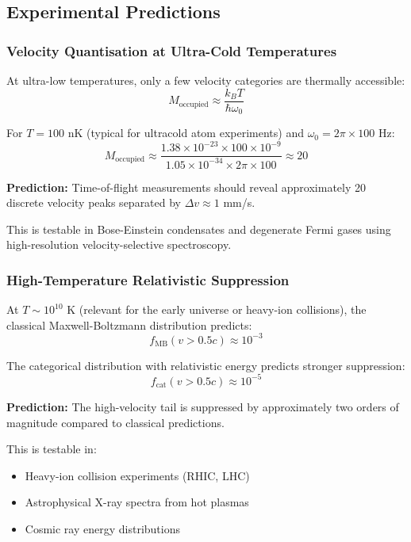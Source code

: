 \subsection{Experimental Predictions}

\subsubsection{Velocity Quantisation at Ultra-Cold Temperatures}

At ultra-low temperatures, only a few velocity categories are thermally accessible:
\begin{equation}
M_{\text{occupied}} \approx \frac{k_B T}{\hbar\omega_0}
\end{equation}

For $T = 100$ nK (typical for ultracold atom experiments) and $\omega_0 = 2\pi \times 100$ Hz:
\begin{equation}
M_{\text{occupied}} \approx \frac{1.38 \times 10^{-23} \times 100 \times 10^{-9}}{1.05 \times 10^{-34} \times 2\pi \times 100} \approx 20
\end{equation}

\textbf{Prediction:} Time-of-flight measurements should reveal approximately 20 discrete velocity peaks separated by $\Delta v \approx 1$ mm/s.

This is testable in Bose-Einstein condensates and degenerate Fermi gases using high-resolution velocity-selective spectroscopy.

\subsubsection{High-Temperature Relativistic Suppression}

At $T \sim 10^{10}$ K (relevant for the early universe or heavy-ion collisions), the classical Maxwell-Boltzmann distribution predicts:
\begin{equation}
f_{\text{MB}}(v > 0.5c) \approx 10^{-3}
\end{equation}

The categorical distribution with relativistic energy predicts stronger suppression:
\begin{equation}
f_{\text{cat}}(v > 0.5c) \approx 10^{-5}
\end{equation}

\textbf{Prediction:} The high-velocity tail is suppressed by approximately two orders of magnitude compared to classical predictions.

This is testable in:
\begin{itemize}
\item Heavy-ion collision experiments (RHIC, LHC)
\item Astrophysical X-ray spectra from hot plasmas
\item Cosmic ray energy distributions
\end{itemize}

